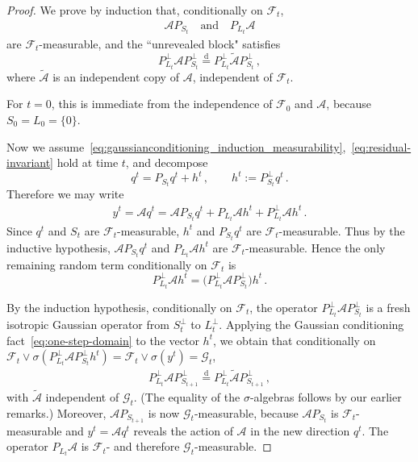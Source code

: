 \documentclass[11pt]{article}
\theoremstyle{definition}
\theoremstyle{remark}
\numberwithin{equation}{section}
\numberwithin{theorem}{section}
\newcommand{\cA}{\mathcal A}
\begin{document}
\begin{proof}
We prove by induction that, conditionally on $\mathscr F_t$,
\begin{align}\label{eq:gaussianconditioning_induction_measurability}
  \mathcal A P_{S_t}
  \quad\text{and}\quad
  P_{L_t}\mathcal A
\end{align}
are $\mathscr F_t$-measurable, and the ``unrevealed block" satisfies
\begin{equation}\label{eq:residual-invariant}
  P_{L_t}^\perp \mathcal A P_{S_t}^\perp
  \stackrel{\mathrm d}{=}
  P_{L_t}^\perp \widetilde{\mathcal A} P_{S_t}^\perp\,,
\end{equation}
where $\widetilde{\mathcal A}$ is an independent copy of $\mathcal A$, independent of $\mathscr F_t$.

For $t=0$, this is immediate from the independence of $\mathscr F_0$ and $\mathcal A$, because $S_0=L_0=\{0\}$.

Now we assume~\eqref{eq:gaussianconditioning_induction_measurability},~\eqref{eq:residual-invariant} hold at time $t$, and decompose
\[
  q^t=P_{S_t}q^t+h^t\,, \qquad h^t:=P_{S_t}^\perp q^t\,.
\]
Therefore we may write
\begin{align*}
y^t=\mathcal A q^t = \mathcal A P_{S_t}q^t + P_{L_t}\mathcal A h^t + P_{L_t}^\perp \mathcal A h^t\,.
\end{align*}
Since $q^t$ and $S_t$ are $\mathscr F_t$-measurable, $h^t$ and $P_{S_t}q^t$ are $\mathscr F_t$-measurable. Thus by the inductive hypothesis, $\mathcal A P_{S_t}q^t$ and $P_{L_t}\mathcal A h^t$ are $\mathscr F_t$-measurable. Hence the only remaining random term conditionally on $\mathscr F_t$ is
\[
  P_{L_t}^\perp \mathcal A h^t
  =
  \big(P_{L_t}^\perp \mathcal A P_{S_t}^\perp\big)h^t\,.
\]

By the induction hypothesis, conditionally on $\mathscr F_t$, the operator $P_{L_t}^\perp \mathcal A P_{S_t}^\perp$ is a fresh isotropic Gaussian operator from $S_t^\perp$ to $L_t^\perp$. Applying the Gaussian conditioning fact~\eqref{eq:one-step-domain} to the vector $h^t$, we obtain that conditionally on $\mathscr F_t \vee \sigma( P_{L_t}^\perp \cA P_{S_t}^\perp h^t)= \mathscr F_t\vee\sigma(y^t) = \mathscr G_t$,
\begin{align}\label{eq:gaussianconditioning_induction_intermediatefreshgaussian}
  P_{L_t}^\perp \mathcal A P_{S_{t+1}}^\perp
  \stackrel{\mathrm d}{=}
  P_{L_t}^\perp \widetilde{\mathcal A}P_{S_{t+1}}^\perp\,,
\end{align}
with $\widetilde{\mathcal A}$ independent of $\mathscr G_t$. (The equality of the $\sigma$-algebras follows by our earlier remarks.) Moreover, $\mathcal A P_{S_{t+1}}$ is now $\mathscr G_t$-measurable, because $\mathcal A P_{S_t}$ is  $\mathscr F_t$-measurable and $y^t=\mathcal A q^t$ reveals the action of $\mathcal A$ in the new direction $q^t$. The operator $P_{L_t}\mathcal A$ is $\mathscr F_t$- and therefore $\mathscr G_t$-measurable.


\end{proof}
\end{document}
